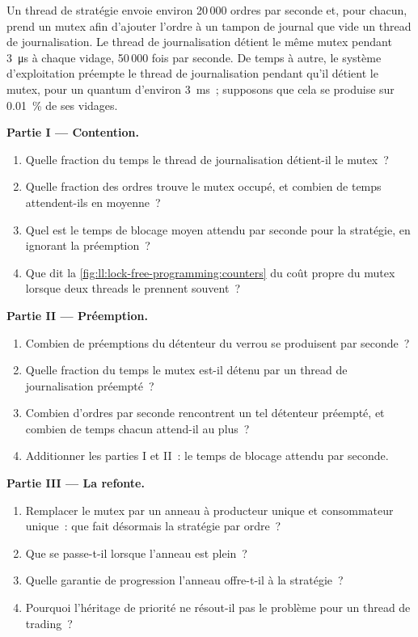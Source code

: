 \begin{problem}\label{pb:ll:lock-free-programming:1}
Un thread de stratégie envoie environ 20\,000 ordres par seconde et, pour chacun, prend un mutex afin d'ajouter l'ordre à un tampon de journal que
vide un thread de journalisation. Le thread de journalisation détient le même mutex pendant \qty{3}{\micro\second} à chaque vidage, 50\,000 fois par seconde.
De temps à autre, le système d'exploitation préempte le thread de journalisation pendant qu'il détient le mutex, pour un quantum d'environ
\qty{3}{\milli\second}~; supposons que cela se produise sur 0.01~\% de ses vidages.

\medskip\noindent\textbf{Partie I --- Contention.}
\begin{enumerate}
\item Quelle fraction du temps le thread de journalisation détient-il le mutex~?
\item Quelle fraction des ordres trouve le mutex occupé, et combien de temps attendent-ils en moyenne~?
\item Quel est le temps de blocage moyen attendu par seconde pour la stratégie, en ignorant la préemption~?
\item Que dit la \cref{fig:ll:lock-free-programming:counters} du coût propre du mutex lorsque deux threads le prennent souvent~?
\end{enumerate}

\medskip\noindent\textbf{Partie II --- Préemption.}
\begin{enumerate}[resume]
\item Combien de préemptions du détenteur du verrou se produisent par seconde~?
\item Quelle fraction du temps le mutex est-il détenu par un thread de journalisation préempté~?
\item Combien d'ordres par seconde rencontrent un tel détenteur préempté, et combien de temps chacun attend-il au plus~?
\item Additionner les parties I et II~: le temps de blocage attendu par seconde.
\end{enumerate}

\medskip\noindent\textbf{Partie III --- La refonte.}
\begin{enumerate}[resume]
\item Remplacer le mutex par un anneau à producteur unique et consommateur unique~: que fait désormais la stratégie par ordre~?
\item Que se passe-t-il lorsque l'anneau est plein~?
\item Quelle garantie de progression l'anneau offre-t-il à la stratégie~?
\item Pourquoi l'héritage de priorité ne résout-il pas le problème pour un thread de trading~?
\end{enumerate}


\end{problem}
